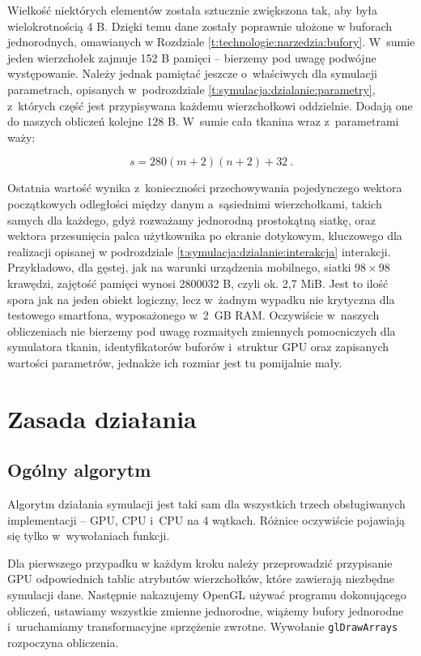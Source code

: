 	Wielkość niektórych elementów została sztucznie zwiększona tak, aby była wielokrotnością 4 B. Dzięki temu dane zostały poprawnie ułożone w buforach jednorodnych, omawianych w Rozdziale \ref{t:technologie:narzedzia:bufory}. W~sumie jeden wierzchołek zajmuje 152 B pamięci -- bierzemy pod uwagę podwójne występowanie. Należy jednak pamiętać jeszcze o~właściwych dla symulacji parametrach, opisanych w~podrozdziale \ref{t:symulacja:dzialanie:parametry}, z~których część jest przypisywana każdemu wierzchołkowi oddzielnie. Dodają one do naszych obliczeń kolejne 128 B. W~sumie cała tkanina wraz z~parametrami waży:
	
	\begin{equation}
	s = 280(m + 2)(n + 2) + 32 \ .
	\end{equation} 
	
	Ostatnia wartość wynika z~konieczności przechowywania pojedynczego wektora początkowych odległości między danym a~sąsiednimi wierzchołkami, takich samych dla każdego, gdyż rozważamy jednorodną prostokątną siatkę, oraz wektora przesunięcia palca użytkownika po ekranie dotykowym, kluczowego dla realizacji opisanej w podrozdziale \ref{t:symulacja:dzialanie:interakcja} interakcji. Przykładowo, dla gęstej, jak na warunki urządzenia mobilnego, siatki \( 98 \times 98 \) krawędzi, zajętość pamięci wynosi 2800032 B, czyli ok. 2,7 MiB. Jest to ilość spora jak na jeden obiekt logiczny, lecz w~żadnym wypadku nie krytyczna dla testowego smartfona, wyposażonego w~2~GB RAM. Oczywiście w~naszych obliczeniach nie bierzemy pod uwagę rozmaitych zmiennych pomocniczych dla symulatora tkanin, identyfikatorów buforów i~struktur GPU oraz zapisanych wartości parametrów, jednakże ich rozmiar jest tu pomijalnie mały.
	
	\section{Zasada działania}
	\label{t:symulacja:dzialanie}
	
		\subsection{Ogólny algorytm}
		\label{t:symulacja:dzialanie:algorytm}
		
		Algorytm działania symulacji jest taki sam dla wszystkich trzech obsługiwanych implementacji -- GPU, CPU i~CPU na 4 wątkach. Różnice oczywiście pojawiają się tylko w~wywołaniach funkcji. 
		
		Dla pierwszego przypadku w każdym kroku należy przeprowadzić przypisanie GPU odpowiednich tablic atrybutów wierzchołków, które zawierają niezbędne symulacji dane. Następnie nakazujemy OpenGL używać programu dokonującego obliczeń, ustawiamy wszystkie zmienne jednorodne, wiążemy bufory jednorodne i~uruchamiamy transformacyjne sprzężenie zwrotne. Wywołanie \texttt{glDrawArrays} rozpoczyna obliczenia. 
		
